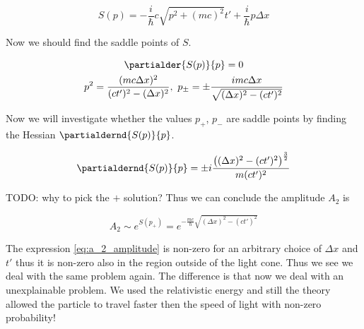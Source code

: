 \begin{equation*}
    S(p) = - \frac{i}{\hbar} c \sqrt{p^{2} + (mc)^{2}} t' + \frac{i}{\hbar}p \Delta x
\end{equation*}

Now we should find the saddle points of $S$.

\begin{equation*}
    \begin{gathered}
        \partialder{S(p)}{p} = 0 \\
        p^{2} = \frac{(m c \Delta x)^{2}}{(c t')^{2} - (\Delta x)^{2}}, \ p_{\pm} = \pm \frac{i m c \Delta x}{\sqrt{(\Delta x)^{2} - (c t')^{2}}}
    \end{gathered}
\end{equation*}

Now we will investigate whether the values $p_{+}$, $p_{-}$ are saddle points by finding the Hessian $\partialdernd{S(p)}{p}$.

\begin{equation*}
    \begin{gathered}
        \partialdernd{S(p)}{p} = \pm i \frac{\big((\Delta x)^{2} - (c t')^{2}\big)^{\frac{3}{2}}}{m (ct')^{2}}
    \end{gathered}
\end{equation*}

TODO: why to pick the $+$ solution? Thus we can conclude the amplitude $A_{2}$ is 

\begin{equation}
    \label{eq:a_2_amplitude}
    A_{2} \sim e^{S(p_{+})} = e^{- \frac{mc}{\hbar} \sqrt{(\Delta x)^{2} - (ct')^{2}}}
\end{equation}

The expression \ref{eq:a_2_amplitude} is non-zero for an arbitrary choice of $\Delta x$ and $t'$ thus it is
non-zero also in the region outside of the light cone. Thus we see we deal with the same problem again.
The difference is that now we deal with an unexplainable problem. We used the relativistic energy and still the theory
allowed the particle to travel faster then the speed of light with non-zero probability! 
